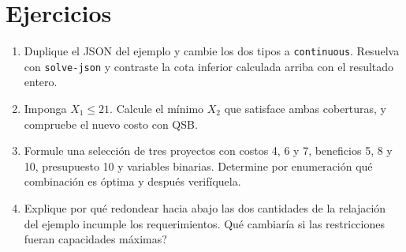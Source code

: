 \section{Ejercicios}
\begin{enumerate}
 \item Duplique el JSON del ejemplo y cambie los dos tipos a
 \texttt{continuous}. Resuelva con \texttt{solve-json} y contraste la cota
 inferior calculada arriba con el resultado entero.
 \item Imponga \(X_1\leq21\). Calcule el mínimo \(X_2\) que satisface ambas
 coberturas, y compruebe el nuevo costo con QSB.
 \item Formule una selección de tres proyectos con costos 4, 6 y 7,
 beneficios 5, 8 y 10, presupuesto 10 y variables binarias. Determine por
 enumeración qué combinación es óptima y después verifíquela.
 \item Explique por qué redondear hacia abajo las dos cantidades de la
 relajación del ejemplo incumple los requerimientos. \textquestiondown{}Qué cambiaría si
 las restricciones fueran capacidades máximas?
\end{enumerate}
